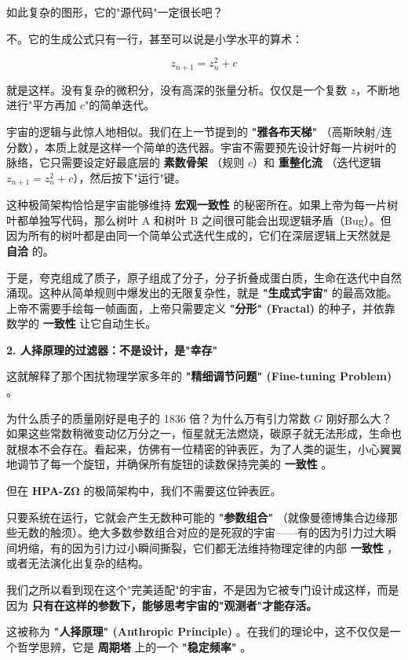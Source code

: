 如此复杂的图形，它的"源代码"一定很长吧？

不。它的生成公式只有一行，甚至可以说是小学水平的算术：

\[z_{n+1} = z_n^2 + c\]

就是这样。没有复杂的微积分，没有高深的张量分析。仅仅是一个复数 $z$，不断地进行"平方再加 $c$"的简单迭代。

宇宙的逻辑与此惊人地相似。我们在上一节提到的 \textbf{"雅各布天梯"} （高斯映射/连分数），本质上就是这样一个简单的迭代器。宇宙不需要预先设计好每一片树叶的脉络，它只需要设定好最底层的 \textbf{素数骨架} （规则 $c$）和 \textbf{重整化流} （迭代逻辑 $z_{n+1} = z_n^2 + c$），然后按下"运行"键。

这种极简架构恰恰是宇宙能够维持 \textbf{宏观一致性} 的秘密所在。如果上帝为每一片树叶都单独写代码，那么树叶 A 和树叶 B 之间很可能会出现逻辑矛盾（Bug）。但因为所有的树叶都是由同一个简单公式迭代生成的，它们在深层逻辑上天然就是 \textbf{自洽} 的。

于是，夸克组成了质子，原子组成了分子，分子折叠成蛋白质，生命在迭代中自然涌现。这种从简单规则中爆发出的无限复杂性，就是 \textbf{"生成式宇宙"} 的最高效能。上帝不需要手绘每一帧画面，上帝只需要定义 \textbf{"分形" (Fractal)} 的种子，并依靠数学的 \textbf{一致性} 让它自动生长。

\textbf{2. 人择原理的过滤器：不是设计，是"幸存"}

这就解释了那个困扰物理学家多年的 \textbf{"精细调节问题" (Fine-tuning Problem)} 。

为什么质子的质量刚好是电子的 1836 倍？为什么万有引力常数 $G$ 刚好那么大？如果这些常数稍微变动亿万分之一，恒星就无法燃烧，碳原子就无法形成，生命也就根本不会存在。看起来，仿佛有一位精密的钟表匠，为了人类的诞生，小心翼翼地调节了每一个旋钮，并确保所有旋钮的读数保持完美的 \textbf{一致性} 。

但在 \textbf{HPA-ZΩ} 的极简架构中，我们不需要这位钟表匠。

只要系统在运行，它就会产生无数种可能的 \textbf{"参数组合"} （就像曼德博集合边缘那些无数的触须）。绝大多数参数组合对应的是死寂的宇宙——有的因为引力过大瞬间坍缩，有的因为引力过小瞬间撕裂，它们都无法维持物理定律的内部 \textbf{一致性} ，或者无法演化出复杂的结构。

我们之所以看到现在这个"完美适配"的宇宙，不是因为它被专门设计成这样，而是因为 \textbf{只有在这样的参数下，能够思考宇宙的"观测者"才能存活。}

这被称为 \textbf{"人择原理" (Anthropic Principle)} 。在我们的理论中，这不仅仅是一个哲学思辨，它是 \textbf{周期塔} 上的一个 \textbf{"稳定频率"} 。

